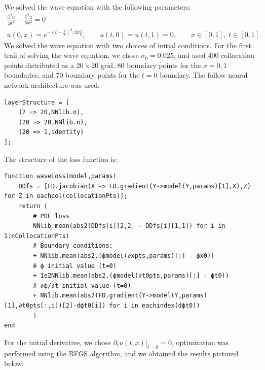 \documentclass[11pt]{article}
\newcommand{\1}{\mathbf 1}
\begin{document}
We solved the wave equation with the following parameters:
\begin{gather}
	\frac{\partial^2 u}{\partial t^2} - \frac{\partial^2 u}{\partial x^2}
	=0
	\\
	u(0,x) = e^{-(t - \tfrac{1}{2})^2/2 \sigma_0^2}, \qquad u(t,0)= u(t,1) = 0, \qquad x \in [0,1], \; t \in [0,1].
\end{gather}
We solved the wave equation with two choices of initial conditions.
For the first trail of solving the wave equation, we chose $\sigma_0 = 0.025$, and used $400$ collocation points distributed as a $20 \times 20$ grid, $80$ boundary points for the $x = 0,1$ boundaries, and $70$ boundary points for the $t = 0$ boundary.
The follow neural network architecture was used:
\begin{singlespace}
\begin{verbatim}
layerStructure = [
    (2 => 20,NNlib.σ),
    (20 => 20,NNlib.σ),
    (20 => 1,identity)
];
\end{verbatim}
The structure of the loss function is:
\begin{verbatim}
function waveLoss(model,params)
    DDfs = [FD.jacobian(X -> FD.gradient(Y->model(Y,params)[1],X),Z) for Z in eachcol(collocationPts)];
    return (
        # PDE loss
        NNlib.mean(abs2(DDfs[i][2,2] - DDfs[i][1,1]) for i in 1:nCollocationPts) 
        # Boundary conditions:
        + NNlib.mean(abs2.(ϕmodel(∂xpts,params)[:] - ϕx0)) 
        # ϕ initial value (t=0)
        + 1e2NNlib.mean(abs2.(ϕmodel(∂t0pts,params)[:] - ϕt0))
        # ∂ϕ/∂t initial value (t=0)
        + NNlib.mean(abs2(FD.gradient(Y->model(Y,params)[1],∂t0pts[:,i])[2]-dϕt0[i]) for i in eachindex(dϕt0))
        )
end
\end{verbatim}
\end{singlespace}
For the initial derivative, we chose $\left.\partial_t u(t,x)\right|_{t = 0} = 0$, optimization was performed using the BFGS algorithm, and we obtained the results pictured below:
\end{document}
